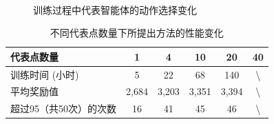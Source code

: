 \begin{figure}[htbp]
  \quad\quad
  \\
  \quad\quad
  \caption{训练过程中代表智能体的动作选择变化}
  \label{agents}
\end{figure}

\begin{table}[htbp]
\centering
\caption{不同代表点数量下所提出方法的性能变化}
\label{cluster_size}
\renewcommand{\arraystretch}{1.2} %
\setlength{\tabcolsep}{6mm} %
\small %

\begin{tabular}{lccccc}
\toprule
代表点数量     & 1  & 4  & 10 & 20  & 40                \\ \midrule
训练时间 (小时)  & 5        & 22        & 68         & 140        & \textbackslash{}       \\
平均奖励值 & 2,684      & 3,203      & 3,351       & 3,394        & \textbackslash{}   \\
超过95（共50次）的次数     & 16        & 41         & 45          & 46          & \textbackslash{}\\ \bottomrule
\end{tabular}
\end{table}


